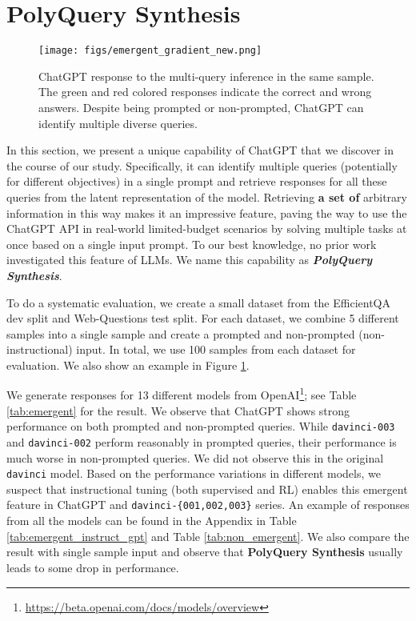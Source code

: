 \documentclass[11pt]{article}
\begin{document}
\section{PolyQuery Synthesis}
\label{sec:emergent}
\begin{figure}
\begin{center}
\texttt{[image: figs/emergent\_gradient\_new.png]}
\caption[overview]{
\small{ChatGPT response to the multi-query inference in the same sample. The green and red colored responses indicate the correct and wrong answers. Despite being prompted or non-prompted, ChatGPT can identify multiple diverse queries.}}
\label{fig:emergent}
\vspace{-0.7cm}
\end{center}
\end{figure}

In this section, we present a unique capability of ChatGPT that we discover in the course of our study. Specifically, it can identify multiple queries (potentially for different objectives)  in a single prompt and retrieve responses for all these queries from the latent representation of the model. Retrieving \textbf{a set of} arbitrary information in this way makes it 
an impressive feature, paving the way to use the ChatGPT API in real-world limited-budget scenarios by solving multiple tasks at once based on a single input prompt. To our best knowledge, no prior work investigated this feature of LLMs. We name this capability as \textbf{\emph{PolyQuery Synthesis}}.

To do a systematic evaluation, we create a small dataset from the EfficientQA dev split \cite{min2021neuripsefficientqa} and Web-Questions \cite{berant-etal-2013-semantic} test split. For each dataset, we combine 5 different samples into a single sample and create a prompted and non-prompted (non-instructional) input. In total, we use 100 samples from each dataset for evaluation.  We also show an example in Figure \ref{fig:emergent}.  

We generate responses for 13 different models from OpenAI\footnote{\url{https://beta.openai.com/docs/models/overview}}; see Table \ref{tab:emergent} for the result. We observe that {ChatGPT} 
shows strong performance on both prompted and non-prompted queries. While \texttt{davinci-003} and \texttt{davinci-002} perform reasonably in prompted queries, their performance is much worse in non-prompted queries. We did not observe this in the original \texttt{davinci} model. Based on the performance variations in different models, we suspect that  instructional tuning (both supervised and RL) enables this emergent feature in ChatGPT and \texttt{davinci-\{001,002,003\}} series. An example of responses from all the models can be found in the Appendix in Table \ref{tab:emergent_instruct_gpt} and Table \ref{tab:non_emergent}. We also compare the result with single sample input and observe that \textbf{PolyQuery Synthesis} usually leads to some drop in performance. 
\end{document}
